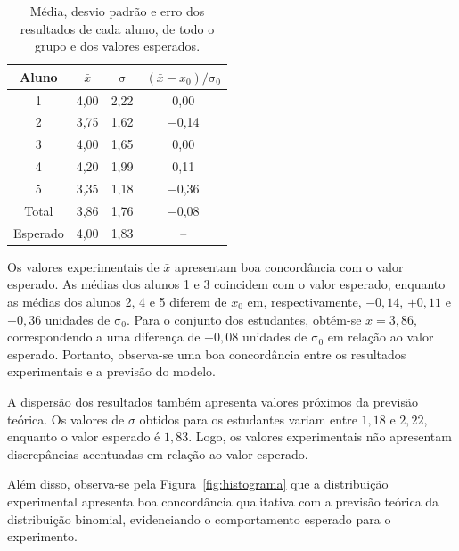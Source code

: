 \documentclass[12pt, a4paper, brazil]{article}
\begin{document}
\begin{table}[H]

\centering
\caption{Média, desvio padrão e erro dos resultados de cada aluno, de todo o grupo e dos valores esperados.}
\begin{tabular}{c c c c}
	\hline
	Aluno    & $\bar{x}$ & $\mathrm{\sigma}$ & $\left(\bar{x}-x_0\right)/\mathrm{\sigma}_0$ \\ [0.5ex]
	\hline
	1        & 4,00      & 2,22          & 0,00   \\
	2        & 3,75      & 1,62          & $-$0,14 \\
	3        & 4,00      & 1,65          & 0,00   \\
	4        & 4,20      & 1,99          & 0,11   \\
	5        & 3,35      & 1,18          & $-$0,36 \\ 

	\hline

	Total    & 3,86      & 1,76          & $-$0,08 \\
	Esperado & 4,00      & 1,83          & --   \\ 

	\hline
\end{tabular}
\label{tab:mediasepm}

\end{table}

Os valores experimentais de $\bar{x}$ apresentam boa concordância com o valor esperado. As médias dos alunos 1 e 3 coincidem com o valor esperado, enquanto as médias dos alunos 2, 4 e 5 diferem de $x_0$ em, respectivamente, $-0,14$, $+0,11$ e $-0,36$ unidades de $\mathrm{\sigma}_0$. Para o conjunto dos estudantes, obtém-se $\bar{x}=3,86$, correspondendo a uma diferença de $-0,08$ unidades de $\mathrm{\sigma}_0$ em relação ao valor esperado. Portanto, observa-se uma boa concordância entre os resultados experimentais e a previsão do modelo.

A dispersão dos resultados também apresenta valores próximos da previsão teórica. Os valores de $\sigma$ obtidos para os estudantes variam entre $1,18$ e $2,22$, enquanto o valor esperado é $1,83$. Logo, os valores experimentais não apresentam discrepâncias acentuadas em relação ao valor esperado.

Além disso, observa-se pela Figura~\ref{fig:histograma} que a distribuição experimental apresenta boa concordância qualitativa com a previsão teórica da distribuição binomial, evidenciando o comportamento esperado para o experimento.
\end{document}
